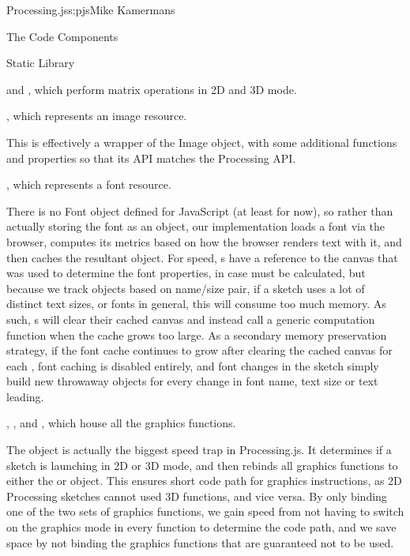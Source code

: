 \begin{aosachapter}{Processing.js}{s:pjs}{Mike Kamermans}
\begin{aosasect1}{The Code Components}
\begin{aosasect2}{Static Library}
\begin{aosadescription}
\item{ and }, which perform matrix operations in 2D and 3D
  mode.

\item{}, which represents an image resource.

This is effectively a wrapper of the Image object, with some
additional functions and properties so that its API matches the
Processing API.

\item{}, which represents a font resource.

There is no Font object defined for JavaScript (at least for now), so
rather than actually storing the font as an object, our 
implementation loads a font via the browser, computes its metrics
based on how the browser renders text with it, and then caches the
resultant  object. For speed, s have a reference to the
canvas that was used to determine the font properties, in case
 must be calculated, but because we track  objects based
on name/size pair, if a sketch uses a lot of distinct text sizes, or
fonts in general, this will consume too much memory. As such, s
will clear their cached canvas and instead call a generic 
computation function when the cache grows too large. As a secondary
memory preservation strategy, if the font cache continues to grow
after clearing the cached canvas for each , font caching is
disabled entirely, and font changes in the sketch simply build new
throwaway  objects for every change in font name, text size or
text leading.

\item{, , and }, which house all the
  graphics functions.

The  object is actually the biggest speed trap in
Processing.js. It determines if a sketch is
launching in 2D or 3D mode, and then rebinds all graphics functions
to either the  or  object. This ensures short code
path for graphics instructions, as 2D Processing sketches cannot used
3D functions, and vice versa. By only binding one of the two sets of
graphics functions, we gain speed from not having to switch on the
graphics mode in every function to determine the code path, and we
save space by not binding the graphics functions that are guaranteed
not to be used.


\end{aosadescription}
\end{aosasect2}
\end{aosasect1}
\end{aosachapter}
